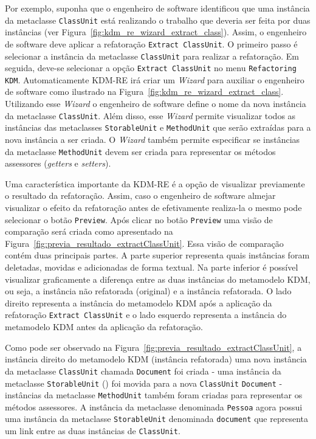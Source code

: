 Por exemplo, suponha que o engenheiro de software identificou que uma instância da metaclasse \texttt{ClassUnit} está realizando o trabalho que deveria ser feita por duas instâncias (ver Figura~\ref{fig:kdm_re_wizard_extract_class}). Assim, o engenheiro de software deve aplicar a refatoração \texttt{Extract ClassUnit}. O primeiro passo é selecionar a instância da metaclasse \texttt{ClassUnit} para realizar a refatoração. Em seguida, deve-se selecionar a opção \texttt{Extract ClassUnit} no menu \texttt{Refactoring KDM}. Automaticamente KDM-RE irá criar um \textit{Wizard} para auxiliar o engenheiro de software como ilustrado na Figura~\ref{fig:kdm_re_wizard_extract_class}. Utilizando esse \textit{Wizard} o engenheiro de software define o nome da nova instância da metaclasse \texttt{ClassUnit}. Além disso, esse \textit{Wizard} permite visualizar todos as instâncias das metaclasses \texttt{StorableUnit} e \texttt{MethodUnit} que serão extraídas para a nova instância a ser criada. O \textit{Wizard} também permite especificar se instâncias da metaclasse \texttt{MethodUnit} devem ser criada para representar os métodos assessores (\textit{getters} e \textit{setters}). 

Uma característica importante da KDM-RE é a opção de visualizar previamente o resultado da refatoração. Assim, caso o engenheiro de software almejar visualizar o efeito da refatoração antes de efetivamente realiza-la o mesmo pode selecionar o botão \texttt{Preview}. Após clicar no botão \texttt{Preview} uma visão de comparação será criada como apresentado na Figura~\ref{fig:previa_resultado_extractClassUnit}. Essa visão de comparação contém duas principais partes. A parte superior representa quais instâncias foram deletadas, movidas e adicionadas de forma textual. Na parte inferior é possível visualizar graficamente a diferença entre as duas instâncias do metamodelo KDM, ou seja, a instância não refatorada (original) e a instância refatorada. O lado direito representa a instância do metamodelo KDM após a aplicação da refatoração \texttt{Extract ClassUnit} e o lado esquerdo representa a instância do metamodelo KDM antes da aplicação da refatoração. 

Como pode ser observado na Figura~\ref{fig:previa_resultado_extractClassUnit}, a instância direito do metamodelo KDM (instância refatorada) uma nova instância da metaclasse \texttt{ClassUnit} chamada \texttt{Document} foi criada - uma instância da metaclasse \texttt{StorableUnit} () foi movida para a nova \texttt{ClassUnit} \texttt{Document} - instâncias da metaclasse \texttt{MethodUnit} também foram criadas para representar os métodos assessores. A instância da metaclasse denominada \texttt{Pessoa} agora possui uma instância da metaclasse \texttt{StorableUnit} denominada \texttt{document} que representa um link entre as duas instâncias de \texttt{ClassUnit}.

